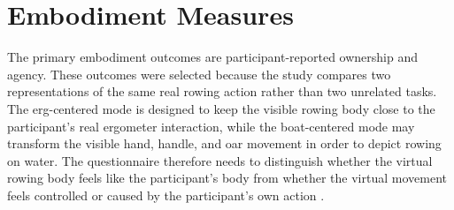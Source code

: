 \section{Embodiment Measures}
\label{sec:study_design_embodiment_measures}

The primary embodiment outcomes are participant-reported ownership and agency.
These outcomes were selected because the study compares two representations of the same real rowing action rather than two unrelated tasks.
The erg-centered mode is designed to keep the visible rowing body close to the participant's real ergometer interaction, while the boat-centered mode may transform the visible hand, handle, and oar movement in order to depict rowing on water.
The questionnaire therefore needs to distinguish whether the virtual rowing body feels like the participant's body from whether the virtual movement feels controlled or caused by the participant's own action \parencite{kilteniEtAl2012senseEmbodiment,kalckertEhrsson2012movingRubberHand}.
%


